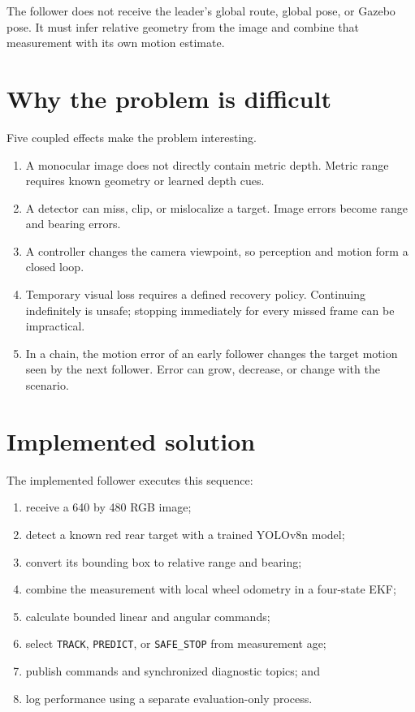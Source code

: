 \documentclass[11pt,oneside,openany]{book}
\newcommand{\state}[1]{\texttt{#1}}
\begin{document}
The follower does not receive the leader's global route, global pose, or Gazebo pose. It must infer relative geometry from the image and combine that measurement with its own motion estimate.

\section{Why the problem is difficult}

Five coupled effects make the problem interesting.
\begin{enumerate}
  \item A monocular image does not directly contain metric depth. Metric range requires known geometry or learned depth cues.
  \item A detector can miss, clip, or mislocalize a target. Image errors become range and bearing errors.
  \item A controller changes the camera viewpoint, so perception and motion form a closed loop.
  \item Temporary visual loss requires a defined recovery policy. Continuing indefinitely is unsafe; stopping immediately for every missed frame can be impractical.
  \item In a chain, the motion error of an early follower changes the target motion seen by the next follower. Error can grow, decrease, or change with the scenario.
\end{enumerate}

\section{Implemented solution}

The implemented follower executes this sequence:
\begin{enumerate}
  \item receive a 640 by 480 RGB image;
  \item detect a known red rear target with a trained YOLOv8n model;
  \item convert its bounding box to relative range and bearing;
  \item combine the measurement with local wheel odometry in a four-state EKF;
  \item calculate bounded linear and angular commands;
  \item select \state{TRACK}, \state{PREDICT}, or \state{SAFE\_STOP} from measurement age;
  \item publish commands and synchronized diagnostic topics; and
  \item log performance using a separate evaluation-only process.
\end{enumerate}
\end{document}
